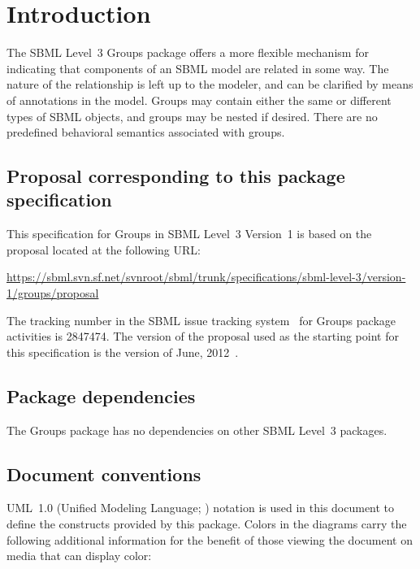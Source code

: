 
\section{Introduction}
\label{intro}

The SBML Level~3 Groups package offers a more flexible mechanism for indicating that components of an SBML model are related in some way.  The nature of the relationship is left up to the modeler, and can be clarified by means of annotations in the model.  Groups may contain either the same or different types of SBML objects, and groups may be nested if desired.  There are no predefined behavioral semantics associated with groups.


\subsection{Proposal corresponding to this package specification}

This specification for Groups in SBML Level~3 Version~1 is based on the proposal located at the following URL:

\begin{center}
  \vspace*{1ex}\small
  \url{https://sbml.svn.sf.net/svnroot/sbml/trunk/specifications/sbml-level-3/version-1/groups/proposal}
  \vspace*{1ex}
\end{center}

The tracking number in the SBML issue tracking system~\citep{tracker} for Groups package activities is 2847474.  The version of the proposal used as the starting point for this specification is the version of June, 2012~\citep{hucka_2012}.


\subsection{Package dependencies}

The Groups package has no dependencies on other SBML Level~3 packages.


\subsection{Document conventions}
\label{conventions}

UML~1.0 (Unified Modeling Language; \citealt{eriksson:1998, oestereich:1999}) notation is used in this document to define the constructs provided by this package.  Colors in the diagrams carry the following additional information for the benefit of those viewing the document on media that can display color:

